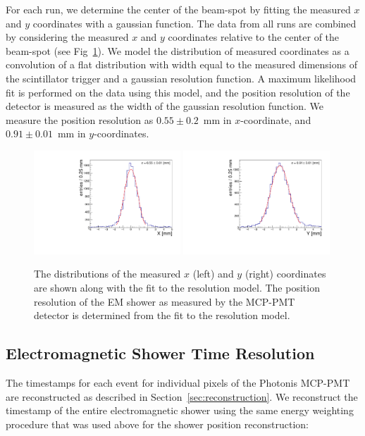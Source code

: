 For each run, we determine the center of the beam-spot by fitting the measured
$x$ and $y$ coordinates with a gaussian function. The data from all runs are
combined by considering the measured $x$ and $y$ coordinates relative to the
center of the beam-spot (see Fig~\ref{fig:ResolutionMeasurement}). We model the
distribution of measured coordinates as a convolution of a flat distribution
with width equal to the measured dimensions of the scintillator trigger and a
gaussian resolution function. A maximum likelihood fit is performed on the data
using this model, and the position resolution of the detector is measured as the
width of the gaussian resolution function. We measure the position resolution as
$0.55\pm0.2$~mm in $x$-coordinate, and $0.91\pm 0.01$~mm in $y$-coordinates.

\begin{figure}[htbp] \centering
\includegraphics[width=0.49\textwidth]{Images/XYResolution/X_Resolution_fixedTrigger.pdf}
\includegraphics[width=0.49\textwidth]{Images/XYResolution/Y_Resolution_fixedTrigger.pdf}
\caption{The distributions of the measured $x$ (left) and $y$ (right)
coordinates are shown along with the fit to the resolution model. The position
resolution of the EM shower as measured by the MCP-PMT detector is determined from
the fit to the resolution model. } \label{fig:ResolutionMeasurement}
\end{figure}

\subsection{Electromagnetic Shower Time Resolution} \label{sec:timing} 
The timestamps for each event for individual pixels of the Photonis MCP-PMT are
reconstructed as described in Section~\ref{sec:reconstruction}. We reconstruct
the timestamp of the entire electromagnetic shower using the same energy
weighting procedure that was used above for the shower position reconstruction:

